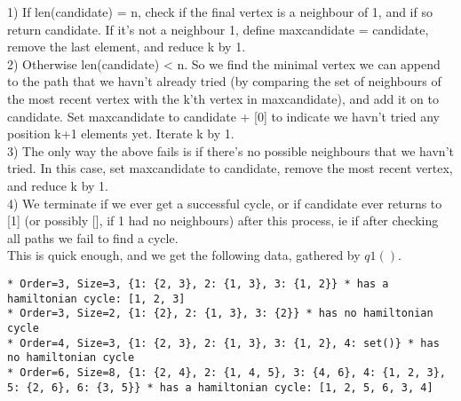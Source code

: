 \documentclass[10pt,a4paper]{report}
\begin{document}
1) If len(candidate) = n, check if the final vertex is a neighbour of 1, and if so return candidate. If it's not a neighbour 1, define maxcandidate = candidate, remove the last element, and reduce k by 1.\\

2) Otherwise len(candidate) < n. So we find the minimal vertex we can append to the path that we havn't already tried (by comparing the set of neighbours of the most recent vertex with the k'th vertex in maxcandidate), and add it on to candidate. Set maxcandidate to candidate + [0] to indicate we havn't tried any position k+1 elements yet. Iterate k by 1.\\

3) The only way the above fails is if there's no possible neighbours that we havn't tried. In this case, set maxcandidate to candidate, remove the most recent vertex, and reduce k by 1. \\

4) We terminate if we ever get a successful cycle, or if candidate ever returns to [1] (or possibly [], if 1 had no neighbours) after this process, ie if after checking all paths we fail to find a cycle. \\

This is quick enough, and we get the following data, gathered by $q1()$. 

\begin{lstlisting}[breaklines]
* Order=3, Size=3, {1: {2, 3}, 2: {1, 3}, 3: {1, 2}} * has a hamiltonian cycle: [1, 2, 3]
* Order=3, Size=2, {1: {2}, 2: {1, 3}, 3: {2}} * has no hamiltonian cycle
* Order=4, Size=3, {1: {2, 3}, 2: {1, 3}, 3: {1, 2}, 4: set()} * has no hamiltonian cycle
* Order=6, Size=8, {1: {2, 4}, 2: {1, 4, 5}, 3: {4, 6}, 4: {1, 2, 3}, 5: {2, 6}, 6: {3, 5}} * has a hamiltonian cycle: [1, 2, 5, 6, 3, 4]
\end{lstlisting}
\end{document}
